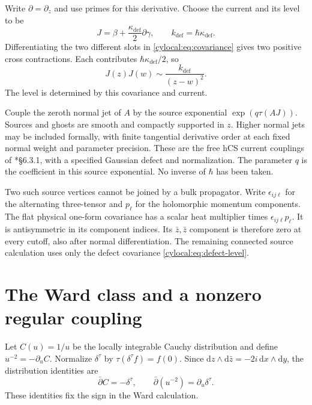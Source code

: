Write $\partial=\partial_z$ and use primes for this derivative.
Choose the current and its level to be
\begin{equation}\label{cylocal:eq:defect-current}
 J=\beta+\frac{\kappa_{\mathrm{def}}}{2}\partial\gamma,
 \qquad k_{\mathrm{def}}=\hbar\kappa_{\mathrm{def}}.
\end{equation}
Differentiating the two different slots in
\eqref{cylocal:eq:covariance} gives two positive cross contractions.
Each contributes $\hbar\kappa_{\mathrm{def}}/2$, so
\begin{equation}\label{cylocal:eq:defect-level}
 J(z)J(w)\sim\frac{k_{\mathrm{def}}}{(z-w)^2}.
\end{equation}
The level is determined by this covariance and current.

Couple the zeroth normal jet of $A$ by the source exponential
$\exp(q\tau(AJ))$. Sources and ghosts are smooth and compactly
supported in $z$. Higher normal jets may be included formally, with
finite tangential derivative order at each fixed normal weight and
parameter precision. These are the free hCS current couplings of
\cite{cylocal:CP}*{\S6.3.1}, with a specified Gaussian defect and
normalization. The parameter $q$ is the coefficient in this source
exponential. No inverse of $\hbar$ has been taken.

Two such source vertices cannot be joined by a bulk propagator.
Write $\epsilon_{ij\ell}$ for the alternating three-tensor and
$p_\ell$ for the holomorphic momentum components.
The flat physical one-form covariance has a scalar heat multiplier
times $\epsilon_{ij\ell}p_\ell$. It is antisymmetric in its
component indices. Its $\bar z,\bar z$ component is
therefore zero at every cutoff, also after normal differentiation.
The remaining connected source calculation uses only the defect
covariance \eqref{cylocal:eq:defect-level}.

\section{The Ward class and a nonzero regular coupling}
\label{cylocal:sec:ward}

Let $C(u)=1/u$ be the locally integrable Cauchy distribution and
define $u^{-2}=-\partial_uC$. Normalize $\delta^\tau$ by
$\tau(\delta^\tau f)=f(0)$. Since
$\mathrm dz\wedge\mathrm d\bar z=-2i\,\mathrm dx\wedge\mathrm dy$,
the distribution identities are
\begin{equation}\label{cylocal:eq:cauchy}
 \bar\partial C=-\delta^\tau,
 \qquad \bar\partial(u^{-2})=\partial_u\delta^\tau.
\end{equation}
These identities fix the sign in the Ward calculation.

